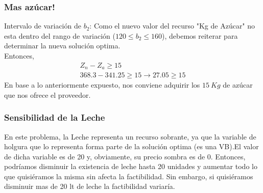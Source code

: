 \begin{homeworkProblem}[-1][Heladería]
\subsubsection{Mas azúcar!}
Intervalo de variación de $b_2$:
Como el nuevo valor del recurso "Kg de Azúcar" no esta dentro del rango de variación ($120 \le b_2 \le 160$), debemos reiterar para determinar la nueva solución optima. \\
Entonces, 
\begin{align*}
    Z_n - Z_a \ge 15 \\
    368.3 - 341.25 \ge 15 \rightarrow 27.05 \ge 15
\end{align*}
En base a lo anteriormente expuesto, nos conviene adquirir los $15\ Kg$ de azúcar que nos ofrece el proveedor.

\subsubsection{Sensibilidad de la Leche}
En este problema, la Leche representa un recurso sobrante, ya que la variable de holgura que lo representa forma parte de la solución optima (es una VB).El valor de dicha variable es de 20 y, obviamente, su precio sombra es de 0. Entonces, podríamos disminuir la existencia de leche hasta 20 unidades y aumentar todo lo que quisiéramos la misma sin afecta la factibilidad. Sin embargo, si quisiéramos disminuir mas de 20 lt de leche la factibilidad variaría.
\end{homeworkProblem}
